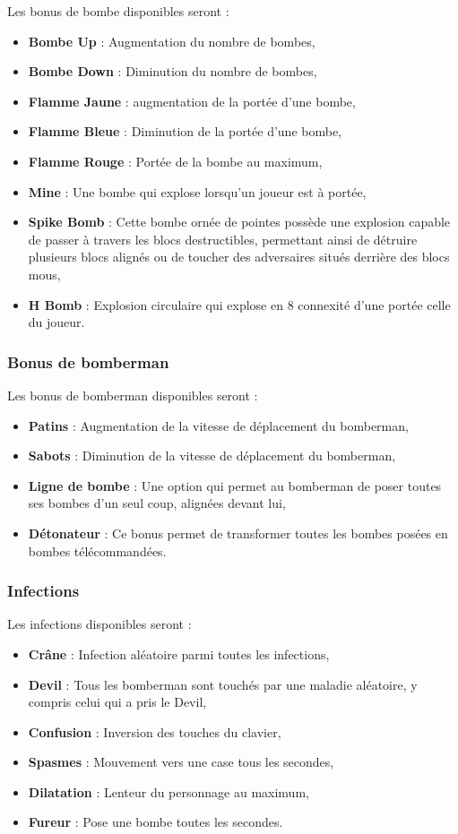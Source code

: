 Les bonus de bombe disponibles seront :
\begin{itemize}
\item \textbf{Bombe Up} : Augmentation du nombre de bombes,
\item \textbf{Bombe Down} : Diminution du nombre de bombes,
\item \textbf{Flamme Jaune} : augmentation de la portée d'une bombe,
\item \textbf{Flamme Bleue} : Diminution de la portée d'une bombe,
\item \textbf{Flamme Rouge} : Portée de la bombe au maximum,
\item \textbf{Mine} : Une bombe qui explose lorsqu'un joueur est à portée,
\item \textbf{Spike Bomb} : Cette bombe ornée de pointes possède une explosion capable de passer à travers les blocs destructibles, permettant ainsi de détruire plusieurs blocs alignés ou de toucher des adversaires situés derrière des blocs mous,
\item \textbf{H Bomb} : Explosion circulaire qui explose en 8 connexité d'une portée celle du joueur.
\end{itemize}

\subsubsection{Bonus de bomberman}

Les bonus de bomberman disponibles seront :
\begin{itemize}
\item \textbf{Patins} : Augmentation de la vitesse de déplacement du bomberman,
\item \textbf{Sabots} : Diminution de la vitesse de déplacement du bomberman,
\item \textbf{Ligne de bombe} : Une option qui permet au bomberman de poser toutes ses bombes d'un seul coup, alignées devant lui,
\item \textbf{Détonateur} : Ce bonus permet de transformer toutes les bombes posées en bombes télécommandées.
\end{itemize}

\subsubsection{Infections}

Les infections disponibles seront :
\begin{itemize}
\item \textbf{Crâne} : Infection aléatoire parmi toutes les infections,
\item \textbf{Devil} : Tous les bomberman sont touchés par une maladie aléatoire, y compris celui qui a pris le Devil,
\item \textbf{Confusion} : Inversion des touches du clavier,
\item \textbf{Spasmes} : Mouvement vers une case tous les \nbSecondes secondes,
\item \textbf{Dilatation} : Lenteur du personnage au maximum,
\item \textbf{Fureur} : Pose une bombe toutes les \nbSecondes secondes.
\end{itemize}